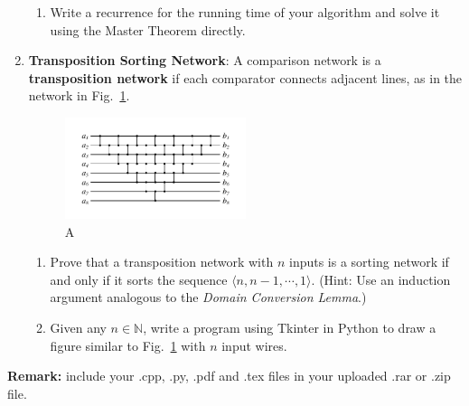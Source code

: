 \documentclass[12pt,a4paper]{article}
\makeatletter
\newtheorem*{solution}{Solution}
\theoremstyle{definition}
\renewenvironment{solution}[1][Solution] {\par\pushQED{\qed}\normalfont\topsep6\p@\@plus6\p@\relax\trivlist\item[\hskip\labelsep\bfseries#1\@addpunct{.}]\ignorespaces}{\popQED\endtrivlist\@endpefalse} \makeatother
\makeatother
\begin{document}
\begin{enumerate}
\begin{enumerate}
        \item
        Write a recurrence for the running time of your algorithm and solve it using the Master Theorem directly.
    \end{enumerate}

    \item
    \textbf{Transposition Sorting Network}: A comparison network is a \textbf{transposition network}  if each comparator connects adjacent lines, as in the network in Fig.~\ref{Fig-Transposition}.

    \begin{figure}[htbp]
        \caption{A}
        \centering
        \includegraphics[width=0.5\textwidth]{Fig-Transposition.pdf}
        
        \label{Fig-Transposition}

    \end{figure}
    
    \begin{enumerate}
        \item
        Prove that a transposition network with $n$ inputs is a sorting network if and only if it sorts the sequence $\langle n, n-1, \cdots, 1 \rangle$. {\color{blue}(Hint: Use an induction argument analogous to the \emph{Domain Conversion Lemma}.)}

        \item
        {\color{red}{(Bonus)}} Given any $n \in \mathbb{N}$, write a program using Tkinter in Python to draw a figure similar to Fig.~\ref{Fig-Transposition} with $n$ input wires.
        
    \end{enumerate}

\end{enumerate}

\vspace{20pt}

\textbf{Remark:} include your .cpp, .py, .pdf and .tex files in your uploaded .rar or .zip file.

\end{document}
